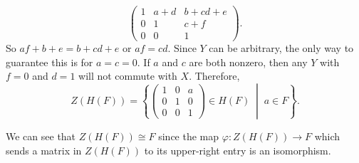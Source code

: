 \begin{solution}
\begin{equation*}
\begin{pmatrix}
      1 & a + d & b + cd + e \\
      0 & 1 & c + f \\
      0 & 0 & 1
    \end{pmatrix}.
  \end{equation*}
  So $af + b + e = b + cd + e$ or $af = cd$. Since $Y$ can be
  arbitrary, the only way to guarantee this is for $a = c = 0$. If $a$
  and $c$ are both nonzero, then any $Y$ with $f = 0$ and $d = 1$ will
  not commute with $X$. Therefore,
  \begin{equation*}
    Z(H(F)) =
    \left\{
    \begin{pmatrix}
      1 & 0 & a \\
      0 & 1 & 0 \\
      0 & 0 & 1
    \end{pmatrix}
    \in H(F)
    \;\middle|\;
    a\in F
    \right\}.
  \end{equation*}

  We can see that $Z(H(F))\cong F$ since the map
  $\varphi\colon Z(H(F))\to F$ which sends a matrix in $Z(H(F))$ to
  its upper-right entry is an isomorphism.
\end{solution}
